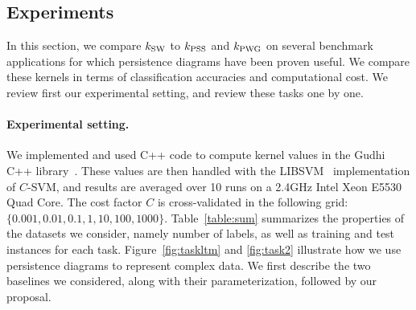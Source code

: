 \subsection{Experiments}
\label{sec:expe}

In this section, we compare $k_{\rm SW}$ to $k_{\rm PSS}$ and $k_{\rm PWG}$ on 
several benchmark applications for which persistence diagrams have been proven useful. 
We compare these kernels in terms of classification 
accuracies and computational cost. We review first our experimental setting, and review these tasks one by one.

\paragraph*{Experimental setting.}
We implemented and used C++ code to compute kernel values in the Gudhi C++ library~\cite{gudhi:Kernels}. These values are then handled with the LIBSVM~\cite{Chang01} implementation of $C$-SVM, and results are averaged over 10 runs
on a 2.4GHz Intel Xeon E5530 Quad Core.
The cost factor $C$ is cross-validated in the following grid: $\{0.001, 0.01,0.1, 1,10,100,1000\}$.
Table~\ref{table:sum} summarizes the properties of the datasets we consider, namely number of labels, as well as training and test instances 
for each task. Figure~\ref{fig:taskltm} and \ref{fig:task2} illustrate how we use persistence diagrams to represent complex data.
We first describe the two baselines we considered, along with their parameterization, followed by our proposal.

